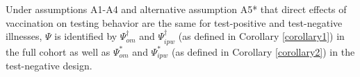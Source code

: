 \begin{appendix}
    

\begin{corollary}
    Under assumptions A1-A4 and alternative assumption A5* that direct effects of vaccination on testing behavior are the same for test-positive and test-negative illnesses, $\Psi$ is identified by $\Psi^\dagger_{om}$ and $\Psi^\dagger_{ipw}$ (as defined in Corollary \ref{corollary1}) in the full cohort as well as $\Psi^*_{om}$ and $\Psi^*_{ipw}$ (as defined in Corollary \ref{corollary2}) in the test-negative design.
\end{corollary}
    

\end{appendix}
